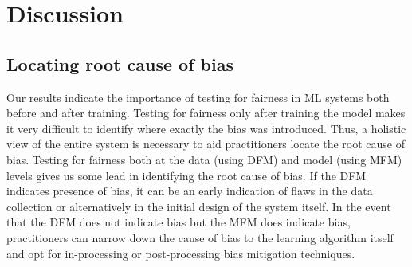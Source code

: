 \documentclass{article}
\begin{document}
\section{Discussion}\label{sec:discuss}






\subsection{Locating root cause of bias}\label{sec:discuss-root-cause-bias}

Our results indicate the importance of testing for fairness in ML
systems both before and after training. Testing for fairness only
after training the model makes it very difficult to identify where
exactly the bias was introduced. Thus, a holistic view of the entire
system is necessary to aid practitioners locate the root cause of
bias. Testing for fairness both at the data (using DFM) and model
(using MFM) levels gives us some lead in identifying the root cause of
bias. If the DFM indicates presence of bias, it can be an early
indication of flaws in the data collection or alternatively in the
initial design of the system itself. In the event that the DFM does
not indicate bias but the MFM does indicate bias, practitioners can
narrow down the cause of bias to the learning algorithm itself and opt
for in-processing or post-processing bias mitigation techniques.
\end{document}
